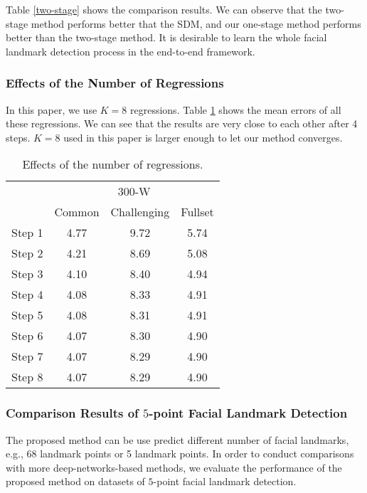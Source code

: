 \documentclass[journal]{IEEEtran}
\begin{document}
Table \ref{two-stage} shows the comparison results. We can observe that the two-stage method performs better that the SDM, and our one-stage method performs better than the two-stage method. It is desirable to learn the whole facial landmark detection process in the end-to-end framework.



\subsubsection{Effects of the Number of Regressions}
In this paper, we use $K=8$ regressions. Table \ref{steps} shows the mean errors of all these regressions. We can see that the results are very close to each other after 4 steps. $K = 8$ used in this paper is larger enough to let our method converges.
\begin{table}[h]
\small
    \centering \caption{Effects of the number of regressions.}
    \begin{tabular}{c|c c c}
      \hline
 & \multicolumn{3}{|c}{300-W}\\
    & Common & Challenging & Fullset \\
        \hline
         Step 1 &  4.77 & 9.72 & 5.74 \\
         \hline
        Step 2 &  4.21 & 8.69 & 5.08 \\
           \hline
         Step 3 & 4.10 & 8.40 & 4.94  \\
         \hline
        Step 4 &  4.08 & 8.33 & 4.91 \\
           \hline
         Step 5 &  4.08 & 8.31 & 4.91  \\
         \hline
        Step 6 &  4.07 & 8.30 & 4.90 \\
           \hline
         Step 7 &  4.07 & 8.29 & 4.90  \\
         \hline
        Step 8 &  4.07 & 8.29 & 4.90 \\
           \hline
        \end{tabular}
    \label{steps}
\end{table}

\subsubsection{Comparison Results of $5$-point Facial Landmark Detection}
The proposed method can be use predict different number of facial landmarks, e.g., 68 landmark points or 5 landmark points. In order to conduct comparisons with more deep-networks-based methods, we evaluate the performance of the proposed method on datasets of $5$-point facial landmark detection.
\end{document}

